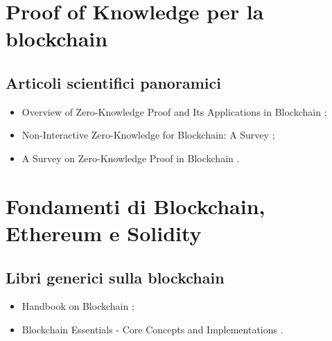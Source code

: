 \section*{Proof of Knowledge per la blockchain}

\subsection*{Articoli scientifici panoramici}
\begin{itemize}

\item Overview of Zero-Knowledge Proof and Its Applications in Blockchain \cite{zhou2022zerochain};

\item Non-Interactive Zero-Knowledge for Blockchain: A Survey \cite{partala2020zerochain};

\item A Survey on Zero-Knowledge Proof in Blockchain \cite{sun2021zerochain}.

\end{itemize}

\section*{Fondamenti di Blockchain, Ethereum e Solidity}

\subsection*{Libri generici sulla blockchain}
\begin{itemize}

\item Handbook on Blockchain \cite{tran2022blockchain};

\item Blockchain Essentials - Core Concepts and Implementations \cite{mangrulkar2024blockchain}.

\end{itemize}

